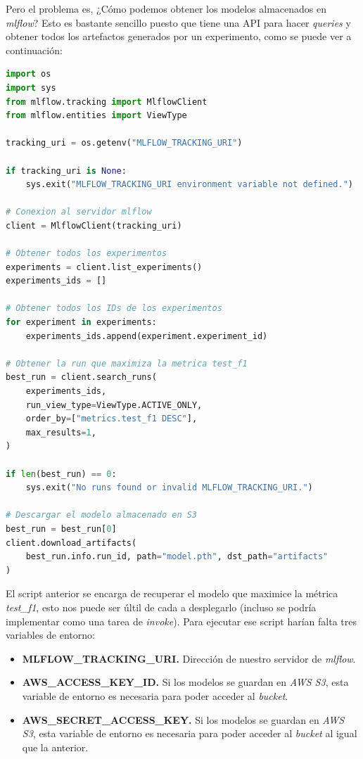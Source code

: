 Pero el problema es, ¿Cómo podemos obtener los modelos almacenados en \textit{mlflow}? Esto es bastante sencillo puesto que tiene una API para hacer \textit{queries} \cite{mlflowtrackingapi} y obtener todos los artefactos generados por un experimento, como se puede ver a continuación:\\

\begin{lstlisting}[language=Python, caption={Script de Python para obtener el modelo que maximiza la métrica \textit{test\_f1}}, captionpos=b, label=lst:getmodel]
import os
import sys
from mlflow.tracking import MlflowClient
from mlflow.entities import ViewType

tracking_uri = os.getenv("MLFLOW_TRACKING_URI")

if tracking_uri is None:
    sys.exit("MLFLOW_TRACKING_URI environment variable not defined.")

# Conexion al servidor mlflow
client = MlflowClient(tracking_uri)

# Obtener todos los experimentos
experiments = client.list_experiments()
experiments_ids = []

# Obtener todos los IDs de los experimentos
for experiment in experiments:
    experiments_ids.append(experiment.experiment_id)

# Obtener la run que maximiza la metrica test_f1
best_run = client.search_runs(
    experiments_ids,
    run_view_type=ViewType.ACTIVE_ONLY,
    order_by=["metrics.test_f1 DESC"],
    max_results=1,
)

if len(best_run) == 0:
    sys.exit("No runs found or invalid MLFLOW_TRACKING_URI.")

# Descargar el modelo almacenado en S3
best_run = best_run[0]
client.download_artifacts(
    best_run.info.run_id, path="model.pth", dst_path="artifacts"
)
\end{lstlisting}

El script anterior se encarga de recuperar el modelo que maximice la métrica \textit{test\_f1}, esto nos puede ser últil de cada a desplegarlo (incluso se podría implementar como una tarea de \textit{invoke}). Para ejecutar ese script harían falta tres variables de entorno:

\begin{itemize}
    \item \textbf{MLFLOW\_TRACKING\_URI.} Dirección de nuestro servidor de \textit{mlflow}.
    \item \textbf{AWS\_ACCESS\_KEY\_ID.} Si los modelos se guardan en \textit{AWS S3}, esta variable de entorno es necesaria para poder acceder al \textit{bucket}.
    \item \textbf{AWS\_SECRET\_ACCESS\_KEY.} Si los modelos se guardan en \textit{AWS S3}, esta variable de entorno es necesaria para poder acceder al \textit{bucket} al igual que la anterior.
\end{itemize}

